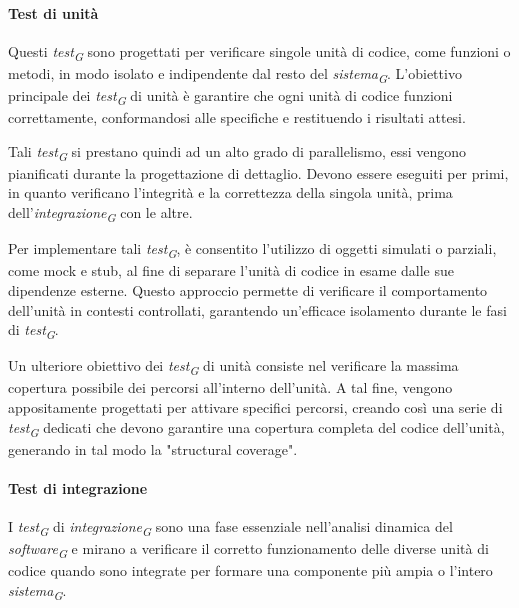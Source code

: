 \paragraph{Test di unità}
Questi \textit{test}\textsubscript{\textit{G}} sono progettati per verificare singole unità di codice, come funzioni o metodi, in modo isolato e indipendente dal resto del \textit{sistema}\textsubscript{\textit{G}}. L'obiettivo principale dei \textit{test}\textsubscript{\textit{G}} di unità è garantire che ogni unità di codice funzioni correttamente, conformandosi alle specifiche e restituendo i risultati attesi.

Tali \textit{test}\textsubscript{\textit{G}} si prestano quindi ad un alto grado di parallelismo, essi vengono pianificati durante la progettazione di dettaglio.
Devono essere eseguiti per primi, in quanto verificano l’integrità e la correttezza della singola unità, prima dell’\textit{integrazione}\textsubscript{\textit{G}} con le altre. 

\vspace{0.2cm}

Per implementare tali \textit{test}\textsubscript{\textit{G}}, è consentito l'utilizzo di oggetti simulati o parziali, come mock e stub, al fine di separare l'unità di codice in esame dalle sue dipendenze esterne. Questo approccio permette di verificare il comportamento dell'unità in contesti controllati, garantendo un'efficace isolamento durante le fasi di \textit{test}\textsubscript{\textit{G}}.

\vspace{0.2cm}

Un ulteriore obiettivo dei \textit{test}\textsubscript{\textit{G}} di unità consiste nel verificare la massima copertura possibile dei percorsi all'interno dell'unità. A tal fine, vengono appositamente progettati per attivare specifici percorsi, creando così una serie di \textit{test}\textsubscript{\textit{G}} dedicati che devono garantire una copertura completa del codice dell'unità, generando in tal modo la "structural coverage".
 
\paragraph{Test di integrazione}
I \textit{test}\textsubscript{\textit{G}} di \textit{integrazione}\textsubscript{\textit{G}} sono una fase essenziale nell'analisi dinamica del \textit{software}\textsubscript{\textit{G}} e mirano a verificare il corretto funzionamento delle diverse unità di codice quando sono integrate per formare una componente più ampia o l'intero \textit{sistema}\textsubscript{\textit{G}}. 

